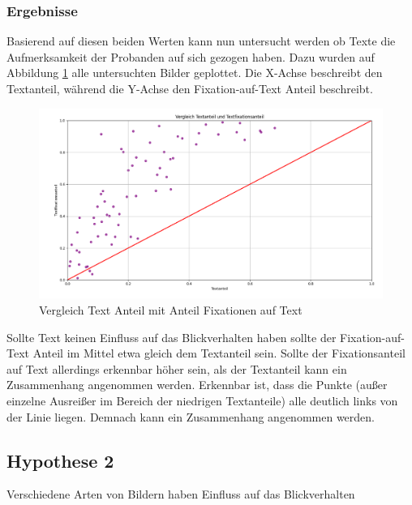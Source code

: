 \documentclass[
    language=german, %
    thesis=seminar, %
    supervisor=postdoc, %
    multiauthor=true, %
    ]{settings/csssa-thesis}
\begin{document}
\subsubsection{Ergebnisse}
Basierend auf diesen beiden Werten kann nun untersucht werden ob Texte die Aufmerksamkeit 
der Probanden auf sich gezogen haben. Dazu wurden auf Abbildung \ref{fig:bild23} alle untersuchten Bilder geplottet. 
Die X-Achse beschreibt den Textanteil, während die Y-Achse den Fixation-auf-Text Anteil beschreibt. 

\begin{figure}[h]
    \centering
    \includegraphics[width=\linewidth,height=0.8\textheight,keepaspectratio]{figures/Bild28.png}
    \caption{Vergleich Text Anteil mit Anteil Fixationen auf Text}\label{fig:bild23}
\end{figure}

Sollte Text keinen Einfluss auf das Blickverhalten haben sollte der Fixation-auf-Text Anteil im Mittel 
etwa gleich dem Textanteil sein. Sollte der Fixationsanteil auf Text allerdings erkennbar höher sein, 
als der Textanteil kann ein Zusammenhang angenommen werden.
Erkennbar ist, dass die Punkte (außer einzelne Ausreißer im Bereich der niedrigen Textanteile) 
alle deutlich links von der Linie liegen. Demnach kann ein Zusammenhang angenommen werden.

\subsection{Hypothese 2}
Verschiedene Arten von Bildern haben Einfluss auf das Blickverhalten
\end{document}
